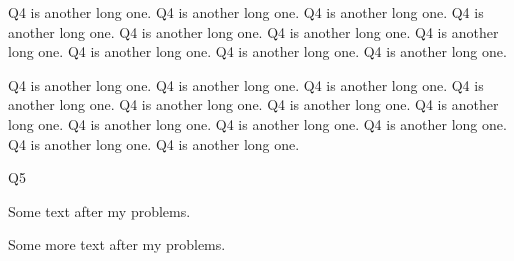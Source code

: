 \documentclass{ximera}
\begin{document}
\begin{problem}
	Q4 is another long one. Q4 is another long one. Q4 is another long one. Q4 is another long one. Q4 is another long one. Q4 is another long one. Q4 is another long one. Q4 is another long one. Q4 is another long one. Q4 is another long one. 
	
	Q4 is another long one. Q4 is another long one. Q4 is another long one. Q4 is another long one. Q4 is another long one. Q4 is another long one. Q4 is another long one. Q4 is another long one. Q4 is another long one. Q4 is another long one. Q4 is another long one. Q4 is another long one. 
\end{problem}

\begin{problem}
	Q5
\end{problem}

Some text after my problems.

Some more text after my problems.
\end{document}

